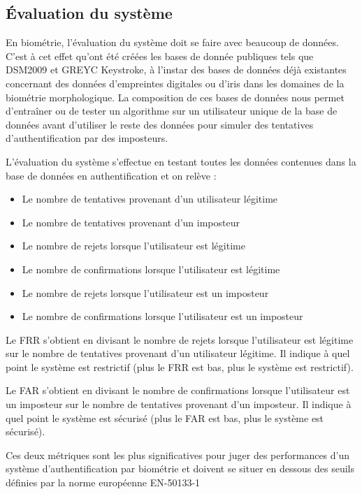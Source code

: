 \subsection{Évaluation du système}

En biométrie, l'évaluation du système doit se faire avec beaucoup de données. C'est à cet effet qu'ont été créées les bases de donnée publiques tels que DSM2009\cite{killourhy2009} et GREYC Keystroke\cite{giotGREYC}, à l'instar des bases de données déjà existantes concernant des données d'empreintes digitales ou d'iris dans les domaines de la biométrie morphologique. La composition de ces bases de données nous permet d'entraîner ou de tester un algorithme sur un utilisateur unique de la base de données avant d'utiliser le reste des données pour simuler des tentatives d'authentification par des imposteurs.

L'évaluation du système s'effectue en testant toutes les données contenues dans la base de données en authentification et on relève :

\begin{itemize}
  \item Le nombre de tentatives provenant d'un utilisateur légitime
  \item Le nombre de tentatives provenant d'un imposteur
  \item Le nombre de rejets lorsque l'utilisateur est légitime
  \item Le nombre de confirmations lorsque l'utilisateur est légitime
  \item Le nombre de rejets lorsque l'utilisateur est un imposteur
  \item Le nombre de confirmations lorsque l'utilisateur est un imposteur
\end{itemize}

Le FRR s'obtient en divisant le nombre de rejets lorsque l'utilisateur est légitime sur le nombre de tentatives provenant d'un utilisateur légitime. Il indique à quel point le système est restrictif (plus le FRR est bas, plus le système est restrictif).

Le FAR s'obtient en divisant le nombre de confirmations lorsque l'utilisateur est un imposteur sur le nombre de tentatives provenant d'un imposteur. Il indique à quel point le système est sécurisé (plus le FAR est bas, plus le système est sécurisé).

Ces deux métriques sont les plus significatives pour juger des performances d'un système d'authentification par biométrie et doivent se situer en dessous des seuils définies par la norme européenne EN-50133-1
